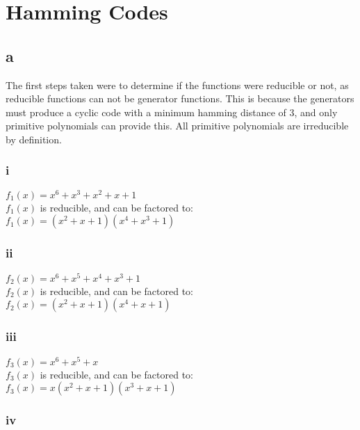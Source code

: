 \section{Hamming Codes}

\subsection{a}
\label{sec:2a}
The first steps taken were to determine if the functions were reducible or not, as reducible functions can not be generator functions.
This is because the generators must produce a cyclic code with a minimum hamming distance of 3, and only primitive polynomials can provide this.
All primitive polynomials are irreducible by definition.

\subsubsection{i}

$f_{1}(x) = x^{6} + x^{3} + x^{2} + x + 1$ \\

\noindent $f_{1}(x)$ is reducible, and can be factored to: \\

\noindent $f_{1}(x) = (x^{2} + x + 1)(x^{4} + x^{3} + 1)$

\subsubsection{ii}

$f_{2}(x) = x^{6} + x^{5} + x^{4} + x^{3} + 1$ \\

\noindent $f_{2}(x)$ is reducible, and can be factored to: \\

\noindent $f_{2}(x) = (x^{2} + x + 1)(x^{4} + x + 1)$

\subsubsection{iii}

$f_{3}(x) = x^{6} + x^{5} + x$ \\

\noindent $f_{3}(x)$ is reducible, and can be factored to: \\

\noindent $f_{3}(x) = x(x^{2} + x + 1)(x^{3} + x + 1)$

\subsubsection{iv}

